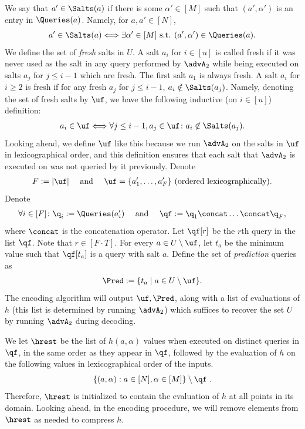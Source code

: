 We say that $a'\in \Salts(a)$ if there is some $\alpha'\in [M]$ such that $(a',\alpha')$ is an entry in $\Queries(a)$. Namely, for $a,a'\in [N]$, 
\begin{align*}
a'\in \Salts(a) \Longleftrightarrow \exists \alpha' \in [M] \text{ s.t. } (a',\alpha') \in \Queries(a).
\end{align*}
 We define the set of \emph{fresh} salts in $U$. A salt $a_i$ for $i \in [u]$ is called fresh if it was never used as the salt in any query performed by $\advA_2$ while being executed on salts $a_j$ for $j\le i-1$ which are fresh. The first salt $a_1$ is always fresh. A salt $a_i$ for $i \ge 2$ is fresh if for any fresh $a_j$ for $j \le i-1$, $a_i \notin \Salts(a_j)$. Namely, denoting the set of fresh salts by $\uf$, we have the following inductive (on $i\in [u]$) definition:
 \begin{align*}
a_i\in \uf \Longleftrightarrow \forall j\le i-1,  a_j \in \uf\colon a_i \not \in \Salts(a_j).  
\end{align*}
Looking ahead, we define $\uf$ like this because we run $\advA_2$ on the salts in $\uf$ in lexicographical order, and this definition ensures that each salt that $\advA_2$ is executed on was not queried by it previously. Denote 
\begin{align*}
F := |\uf| \quad \text{ and }  \quad \uf=\{a_1',\ldots,a_F'\} \text{ (ordered lexicographically).}
\end{align*}
Denote
\begin{align*}
 \forall i\in [F]\colon \q_i:=\Queries(a_i') \quad \text{ and } \quad \qf:=\q_1\concat\ldots\concat \q_F,
 \end{align*}
 where $\concat$ is the concatenation operator. Let $\qf[r]$ be the $r$th query in the list $\qf$. Note that $r\in [F\cdot T]$.
 For every $a\in U\setminus \uf$, let $t_a$ be the minimum value such that $\qf[t_a]$ is a query with salt $a$. 
 Define the set of \emph{prediction} queries as 
 \begin{align*}
 \Pred:=\{t_a\mid a\in U\setminus \uf\}.
 \end{align*}
The encoding algorithm will output $\uf,\Pred$, along with a list of evaluations of $h$ (this list is determined by running $\advA_2$) which suffices to recover the set $U$ by running $\advA_2$ during decoding.

 We let $\hrest$ be the list of $h(a,\alpha)$ values when executed on distinct queries in $\qf$, in the same order as they appear in $\qf$, followed by the evaluation of $h$ on the following values in lexicographical order of the inputs. 
 \[
 \{(a,\alpha):a\in [N],\alpha\in [M]\}\setminus \qf\;.
 \]
 Therefore, $\hrest$ is initialized to contain the evaluation of $h$ at all points in its domain. Looking ahead, in the encoding procedure, we will remove elements from $\hrest$ as needed to compress $h$.


